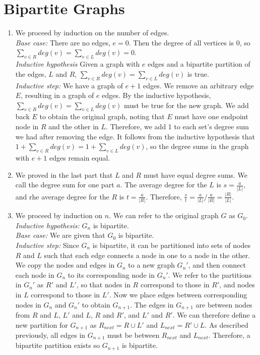 \documentclass{article}
\begin{document}
\section{Bipartite Graphs}
\begin{enumerate}[label=(\alph*)]
	\item We proceed by induction on the number of edges. \\
	\textit{Base case:} There are no edges, $e=0$. Then the degree of all vertices is 0, so $\sum_{v\in R} deg(v) = \sum_{v\in L} deg(v) = 0$.\\
	\textit{Inductive hypothesis} Given a graph with $e$ edges and a bipartite partition of the edges, $L$ and $R$, $\sum_{v\in R} deg(v) = \sum_{v\in L} deg(v)$ is true.\\
	\textit{Inductive step:} We have a graph of $e+1$ edges. We remove an arbitrary edge $E$, resulting in a graph of $e$ edges. By the inductive hypothesis, $\sum_{v\in R} deg(v) = \sum_{v\in L} deg(v)$ must be true for the new graph. We add back $E$ to obtain the original graph, noting that $E$ must have one endpoint node in $R$ and the other in $L$. Therefore, we add 1 to each set's degree sum we had after removing the edge. It follows from the inductive hypothesis that $1+\sum_{v\in R} deg(v) = 1+\sum_{v\in L} deg(v)$, so the degree sums in the graph with $e+1$ edges remain equal.\\
	\item We proved in the last part that $L$ and $R$ must have equal degree sums. We call the degree sum for one part $a$. The average degree for the $L$ is $s = \frac{a}{|L|}$, and rhe average degree for the $R$ is $t = \frac{a}{|R|}$. Therefore, $\frac{s}{t} =\frac{a}{|L|} /\frac{a}{|R|}=\frac{|R|}{|L|}$.
	\item We proceed by induction on $n$. We can refer to the original graph $G$ as $G_0$.\\
	\textit{Inductive hypothesis:} $G_n$ is bipartite.\\
	\textit{Base case:} We are given that $G_0$ is bipartite.\\
	\textit{Inductive step:} Since $G_n$ is bipartite, it can be partitioned into sets of nodes $R$ and $L$ such that each edge connects a node in one to a node in the other. We copy the nodes and edges in $G_n$ to a new graph $G_n '$, and then connect each node in $G_n$ to its corresponding node in $G_n '$. We refer to the partitions in $G_n '$ as $R'$ and $L'$, so that nodes in $R$ correspond to those in $R'$, and nodes in $L$ correspond to those in $L'$. Now we place edges between corresponding nodes in $G_n$ and $G_n'$ to obtain $G_{n+1}$. The edges in $G_{n+1}$ are between nodes from $R$ and $L$, $L'$ and $L$, $R$ and $R'$, and $L'$ and $R'$. We can therefore define a new partition for $G_{n+1}$ as $R_{next} = R\cup L'$ and $L_{next} = R'\cup L$. As described previously, all edges in $G_{n+1}$ must be between $R_{next}$ and $L_{next}$. Therefore, a bipartite partition exists so $G_{n+1}$ is bipartite.
	
\end{enumerate}
\end{document}
